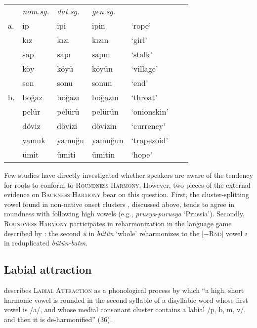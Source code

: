 \begin{example}
\begin{tabular}{lllllll}
   & \emph{nom.sg.} & \emph{dat.sg.} & \emph{gen.sg.}  \\
a. & {ip}           & {ipi}          & {ipin}         & `rope' & \citep[][216]{Clements1982} \\
   & {kız}          & {kızı}         & {kızın}        & `girl'    \\
   & {sap}          & {sapı}         & {sapın}        & `stalk'  \\
   & {köy}          & {köyü}         & {köyün}        & `village' \\
   & {son}          & {sonu}         & {sonun}        & `end'     \\
b. & {boğaz}        & {boğazı}       & {boğazın}      & `throat'  & \citep{TELL} \\
   & {pelür}        & {pelürü}       & {pelürün}      & `onionskin' \\
   & {döviz}        & {dövizi}       & {dövizin}      & `currency'  \\
   & {yamuk}        & {yamuğu}       & {yamuğun}      & `trapezoid' \\
   & {ümit}         & {ümiti}        & {ümitin}       & `hope'      \\
\end{tabular}
\end{example}

Few studies have directly investigated whether speakers are aware of the tendency for roots to conform to \textsc{Roundness Harmony}. However, two pieces of the external evidence on \textsc{Backness Harmony} bear on this question. First, the cluster-splitting vowel found in non-native onset clusters
, discussed above, tends to agree in roundness with following high vowels (e.g., \emph{prusya}-\emph{purusya} `Prussia'). Secondly, \textsc{Roundness Harmony} participates in reharmonization in the language game described by \citeauthor{Harrison2001}: the second \emph{ü} in \emph{bütün} `whole' reharmonizes to the [$-$\textsc{Rnd}] vowel \emph{ı} in reduplicated \emph{bütün-batın}.

\subsection{Labial attraction}

\citet{Lees1966b} describes \textsc{Labial Attraction} as a phonological process by which ``a high, short harmonic vowel is rounded in the second syllable of a disyllabic word whose first vowel is /a/, and whose medial consonant cluster contains a labial /p, b, m, v/, and then it is de-harmonified'' (36).

